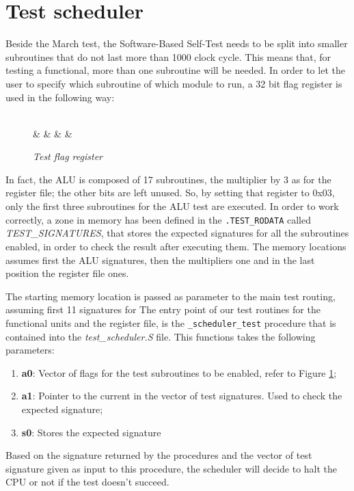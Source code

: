 \documentclass[paper=a4, fontsize=10pt]{scrartcl}	%
\begin{document}
	\section{Test scheduler}
	Beside the March test, the Software-Based Self-Test needs to be split into smaller subroutines that do not last more than 1000 clock cycle. This means that, for testing a functional, more than one subroutine will be needed. In order to let the user to specify which subroutine of which module to run, a 32 bit flag register is used in the following way:
	\begin{figure}[ht]
		\begin{center}
			\begin{bytefield}[endianness=big,bitwidth=0.03\linewidth]{32}
				 \\
				 &  &  &   & \\
			\end{bytefield}
		\end{center}
		\caption{\textit{Test flag register}}
		\label{fig:test_flag}
	\end{figure}
	In fact, the ALU is composed of 17 subroutines, the multiplier by 3 as for the register file; the other bits are left unused. So, by setting that register to 0x03, only the first three subroutines for the ALU test are executed.\newline\newline
	In order to work correctly, a zone in memory has been defined in the \texttt{.TEST\_RODATA} called \textit{TEST\_SIGNATURES}, that stores the expected signatures for all the subroutines enabled, in order to check the result after executing them. The memory locations assumes first the ALU signatures, then the multipliers one and in the last position the register file ones.
	
	The starting memory location is passed as parameter to the main test routing, assuming first 11 signatures for 
	The entry point of our test routines for the functional units and the register file, is the \texttt{\_scheduler\_test} procedure that is contained into the \textit{test\_scheduler.S} file. This functions takes the following parameters:
	\begin{enumerate}
		\itemsep0sp
		\item \textbf{a0}: Vector of flags for the test subroutines to be enabled, refer to Figure \ref{fig:test_flag};
		\item \textbf{a1}: Pointer to the current in the vector of test signatures. Used to check the expected signature;
		\item \textbf{s0}: Stores the expected signature 
	\end{enumerate}
	Based on the signature returned by the procedures and the vector of test signature given as input to this procedure, the scheduler will decide to halt the CPU or not if the test doesn't succeed.
	
\end{document}
